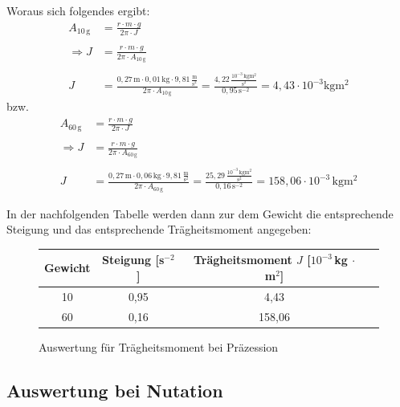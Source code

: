 \documentclass[fontsize=12pt]{scrartcl}
\begin{document}
Woraus sich folgendes ergibt:
\begin{align*}
A_{10\,\text{g}}&= \frac{r\cdot m\cdot g}{2\pi\cdot J}\\
~\\
 \Rightarrow J&= \frac{r\cdot m\cdot g}{2\pi\cdot A_{10\,\text{g}}}\\
~\\
 J&=  \frac{0,27\,{\text{m}} \cdot 0,01\,{\text{kg}} \cdot 9,81\,\frac{{\text{m}}}{{\text{s}^2}}}{2\pi\cdot A_{10\,\text{g}}} =  \frac{4,22\,\frac{10^{-3}\,\text{kg}{\text{m}^2}}{{\text{s}^2}} }{0,95\,\text{s}^{-2}}= 4,43\cdot 10^{-3}  \text{kg}{\text{m}^2}
\end{align*}
bzw.
\begin{align*}
A_{60\,\text{g}}&= \frac{r\cdot m\cdot g}{2\pi\cdot J}\\
~\\
 \Rightarrow J&= \frac{r\cdot m\cdot g}{2\pi\cdot A_{60\,\text{g}}}\\
~\\
 J&=  \frac{0,27\,{\text{m}} \cdot 0,06\,{\text{kg}} \cdot 9,81\,\frac{{\text{m}}}{{\text{s}^2}}}{2\pi\cdot A_{60\,\text{g}}} =  \frac{25,29\,\frac{10^{-3}\,\text{kg}{\text{m}^2}}{{\text{s}^2}} }{0,16\,\text{s}^{-2}}=158,06\cdot 10^{-3}\,\text{kg}{\text{m}^2}
\end{align*}

In der nachfolgenden Tabelle werden dann zur dem Gewicht die entsprechende Steigung und das entsprechende Trägheitsmoment angegeben:
\begin{figure}[H]
\centering
\caption{Auswertung für Trägheitsmoment bei Präzession}
\begin{tabular}{|c|c|c|c|} \hline
Gewicht & Steigung [s$^{-2}$]& Trägheitsmoment $J$ [$10^{-3}$\,kg $\cdot$ m$^2$] \\ \hline
10 & 0,95 & 4,43  \\ \hline
60 & 0,16 & 158,06 \\ \hline
\end{tabular}				 
\end{figure}

\newpage

\subsection{Auswertung bei Nutation}
\end{document}
